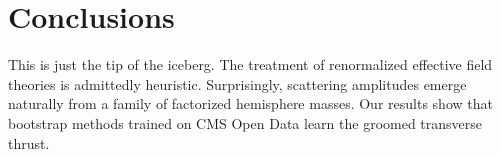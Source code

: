 \section{Conclusions}\label{sec:conclusions}

This is just the tip of the iceberg. The treatment of renormalized
effective field theories is admittedly heuristic. Surprisingly,
scattering amplitudes emerge naturally from a family of factorized
hemisphere masses. Our results show that bootstrap methods trained on
CMS Open Data learn the groomed transverse thrust.

